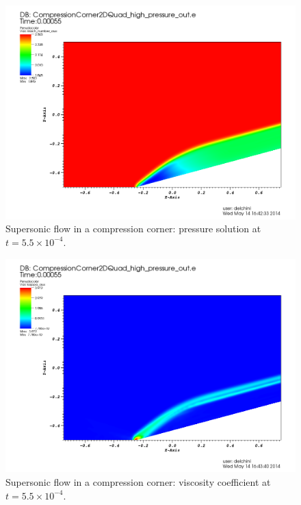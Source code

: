            \begin{figure}[H]%
                \centering
                \includegraphics[width=\textwidth]{figures/CCDensityTime0p00055.png}
                \caption{Supersonic flow in a compression corner: pressure solution at $t=5.5 \times 10^{-4}$.}
                \label{fig:2d_cpc_rho_055}
        \end{figure}%
        \begin{figure}[H]%
                \centering
                \includegraphics[width=\textwidth]{figures/CCViscosityTime0p00055.png}
                \caption{Supersonic flow in a compression corner: viscosity coefficient at $t=5.5 \times 10^{-4}$.}
                \label{fig:2d_cpc_visc_055}
        \end{figure}
